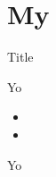 \chapter{My}
\lipsum[1]
\begin{sideline}{Title}
\lipsum[1]
\end{sideline}
\begin{sideline}{Yo}
\begin{itemize}
\item \lipsum[1]
\item \lipsum[2]\sdlendhere
\end{itemize}
\end{sideline}
\begin{sideline}{Yo}
\lipsum[1]
\end{sideline}
\lipsum[2]